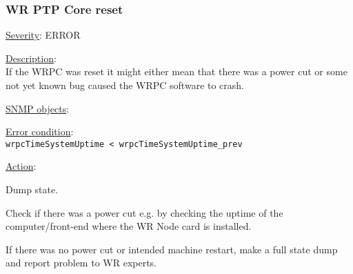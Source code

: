 \subsubsection{\bf WR PTP Core reset}
		\label{fail:other:reset}
		\begin{pck_descr}
			\item [] \underline{Severity}: ERROR
			\item [] \underline{Description}:\\
				If the WRPC was reset it might either mean that there was a power cut or
				some not yet known bug caused the WRPC software to crash.
			\item [] \underline{SNMP objects}:\\
				{\footnotesize
				 }
			\item [] \underline{Error condition}:\\
				{\footnotesize
				\texttt{wrpcTimeSystemUptime < wrpcTimeSystemUptime\_prev} }
      \item [] \underline{Action}:
        \begin{pck_proc}
        \item Dump state.
        \item Check if there was a power cut e.g. by checking the uptime of the
          computer/front-end where the WR Node card is installed.
        \item If there was no power cut or intended machine restart, make a full
          state dump and report problem to WR experts.
        \end{pck_proc}
		\end{pck_descr}

